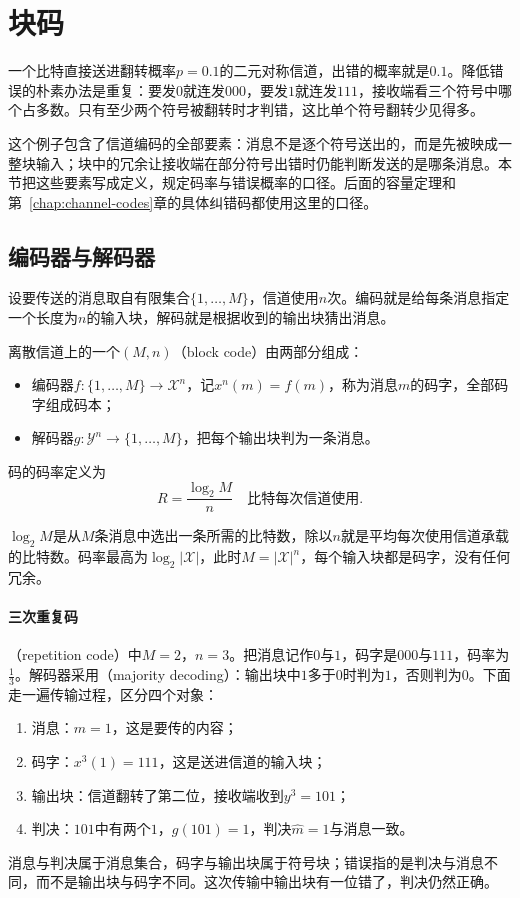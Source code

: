 \section{块码}
\label{sec:dcc-block-codes}

一个比特直接送进翻转概率$p=0.1$的二元对称信道，出错的概率就是$0.1$。降低错误的朴素办法是重复：要发$0$就连发$000$，要发$1$就连发$111$，接收端看三个符号中哪个占多数。只有至少两个符号被翻转时才判错，这比单个符号翻转少见得多。

这个例子包含了信道编码的全部要素：消息不是逐个符号送出的，而是先被映成一整块输入；块中的冗余让接收端在部分符号出错时仍能判断发送的是哪条消息。本节把这些要素写成定义，规定码率与错误概率的口径。后面的容量定理和第~\ref{chap:channel-codes}章的具体纠错码都使用这里的口径。

\subsection{编码器与解码器}
\label{sec:dcc-encoder-decoder}

设要传送的消息取自有限集合$\{1,\dots,M\}$，信道使用$n$次。编码就是给每条消息指定一个长度为$n$的输入块，解码就是根据收到的输出块猜出消息。

\begin{definition}[块码]
\label{def:dcc-block-code}
离散信道上的一个$(M,n)$（block code）由两部分组成：
\begin{itemize}
 \item 编码器$f:\{1,\dots,M\}\to\mathcal{X}^n$，记$x^n(m)=f(m)$，称为消息$m$的码字，全部码字组成码本；
 \item 解码器$g:\mathcal{Y}^n\to\{1,\dots,M\}$，把每个输出块判为一条消息。
\end{itemize}
码的码率定义为
\begin{equation}
 R=\frac{\log_2M}{n}\quad\text{比特每次信道使用}.
 \label{eq:dcc-rate}
\end{equation}
\end{definition}

$\log_2M$是从$M$条消息中选出一条所需的比特数，除以$n$就是平均每次使用信道承载的比特数。码率最高为$\log_2\lvert\mathcal{X}\rvert$，此时$M=\lvert\mathcal{X}\rvert^n$，每个输入块都是码字，没有任何冗余。

\paragraph{三次重复码}
（repetition code）中$M=2$，$n=3$。把消息记作$0$与$1$，码字是$000$与$111$，码率为$\tfrac13$。解码器采用（majority decoding）：输出块中$1$多于$0$时判为$1$，否则判为$0$。下面走一遍传输过程，区分四个对象：
\begin{enumerate}
 \item 消息：$m=1$，这是要传的内容；
 \item 码字：$x^3(1)=111$，这是送进信道的输入块；
 \item 输出块：信道翻转了第二位，接收端收到$y^3=101$；
 \item 判决：$101$中有两个$1$，$g(101)=1$，判决$\hat{m}=1$与消息一致。
\end{enumerate}
消息与判决属于消息集合，码字与输出块属于符号块；错误指的是判决与消息不同，而不是输出块与码字不同。这次传输中输出块有一位错了，判决仍然正确。

